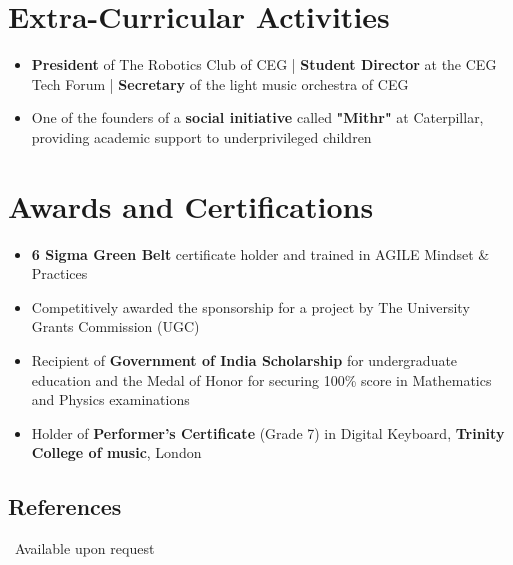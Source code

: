 \documentclass[a4paper,10pt]{article} %
\begin{document}

\section{Extra-Curricular Activities}
\begin{itemize} \itemsep -2pt %
\item \textbf{President} of The Robotics Club of CEG | \textbf{Student Director} at the CEG Tech Forum | \textbf{Secretary} of the light music orchestra of CEG    		
\item One of the founders of a \textbf{social initiative} called \textbf{"Mithr"} at Caterpillar, providing academic support to underprivileged children
\end{itemize}




\section{Awards and Certifications}
\begin{itemize} \itemsep -2pt %
\item \textbf{6 Sigma Green Belt} certificate holder and trained in AGILE Mindset \& Practices
\item Competitively awarded the sponsorship for a project by The University Grants Commission (UGC)
\item Recipient of \textbf{Government of India Scholarship} for undergraduate education and the Medal of Honor for securing 100\% score in Mathematics and Physics examinations
\item Holder of \textbf{Performer’s Certificate} (Grade 7) in Digital Keyboard, \textbf{Trinity College of music}, London
\end{itemize}


\subsection{References}
\ Available upon request
\end{document}
